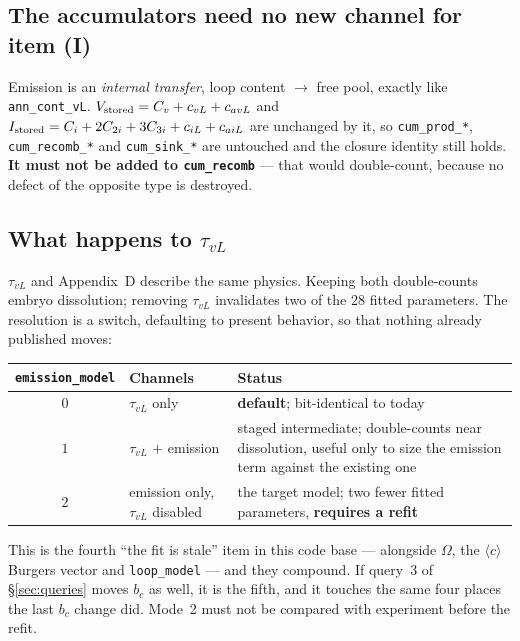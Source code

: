 \documentclass[11pt]{article}
\newcommand{\cloop}{\ensuremath{\langle c\rangle}}
\begin{document}
\subsection{The accumulators need no new channel for item (I)}

Emission is an \emph{internal transfer}, loop content $\to$ free pool, exactly
like \verb|ann_cont_vL|.  $V_{\rm stored}=C_v+c_{vL}+c_{avL}$ and
$I_{\rm stored}=C_i+2C_{2i}+3C_{3i}+c_{iL}+c_{aiL}$ are unchanged by it, so
\verb|cum_prod_*|, \verb|cum_recomb_*| and \verb|cum_sink_*| are untouched and
the closure identity still holds.  \textbf{It must not be added to
\texttt{cum\_recomb}} --- that would double-count, because no defect of the
opposite type is destroyed.

\subsection{What happens to \texorpdfstring{$\tau_{vL}$}{tau\_vL}}
\label{sec:tau}

$\tau_{vL}$ and Appendix~D describe the same physics.  Keeping both
double-counts embryo dissolution; removing $\tau_{vL}$ invalidates two of the
28 fitted parameters.  The resolution is a switch, defaulting to present
behavior, so that nothing already published moves:

\begin{center}\small
\begin{tabular}{@{}clp{}@{}}
\toprule
\verb|emission_model| & \textbf{Channels} & \textbf{Status}\\
\midrule
$0$ & $\tau_{vL}$ only & \textbf{default}; bit-identical to today\\
$1$ & $\tau_{vL}$ $+$ emission & staged intermediate; double-counts near
  dissolution, useful only to size the emission term against the existing one\\
$2$ & emission only, $\tau_{vL}$ disabled & the target model; two fewer fitted
  parameters, \textbf{requires a refit}\\
\bottomrule
\end{tabular}
\end{center}

This is the fourth ``the fit is stale'' item in this code base --- alongside
$\Omega$, the \cloop{} Burgers vector and \verb|loop_model| --- and they
compound.  If query~3 of \S\ref{sec:queries} moves $b_c$ as well, it is the
fifth, and it touches the same four places the last $b_c$ change did.  Mode~2
must not be compared with experiment before the refit.
\end{document}

